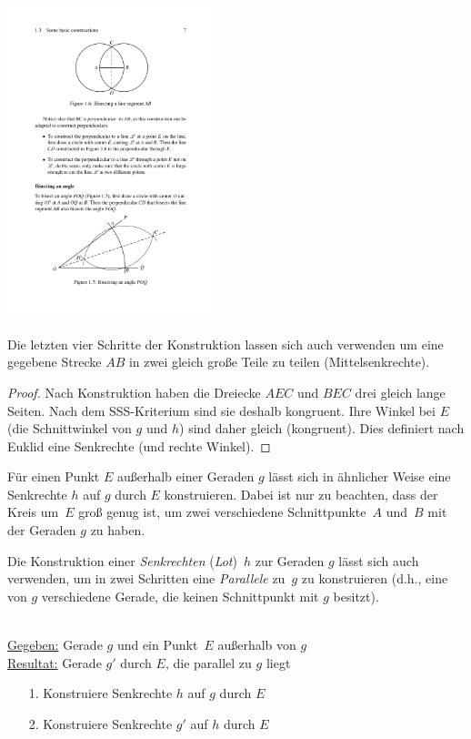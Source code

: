 \centerline{\includegraphics[width=6cm]{BILDER/BildKonstruktionStreckenhalbierung.pdf}}


Die letzten vier Schritte der Konstruktion lassen sich auch
verwenden um eine gegebene Strecke $AB$ in zwei gleich große Teile zu
teilen (Mittelsenkrechte).




\begin{proof}
Nach Konstruktion haben die Dreiecke $AEC$ und $BEC$ drei gleich lange
Seiten. Nach dem SSS-Kriterium sind sie deshalb kongruent. Ihre Winkel
bei $E$ (die Schnittwinkel von $g$ und $h$) sind daher gleich
(kongruent). 
Dies definiert nach Euklid eine Senkrechte (und rechte Winkel).
\end{proof}

Für einen Punkt $E$ außerhalb einer Geraden $g$ lässt sich 
in ähnlicher Weise eine Senkrechte $h$ auf $g$ durch $E$ konstruieren.
Dabei ist nur zu beachten, dass der Kreis um~$E$ groß genug ist, um
zwei verschiedene Schnittpunkte~$A$ und~$B$ mit der Geraden $g$ zu
haben.

Die Konstruktion einer  {\em Senkrechten} ({\em Lot})~$h$ zur Geraden $g$
lässt sich auch verwenden, um in zwei Schritten eine {\em Parallele}
zu~$g$ zu konstruieren (d.h., eine von $g$ verschiedene Gerade, die
keinen Schnittpunkt mit $g$ besitzt).



\begin{konst}  
\phantom{Pups}\hspace*{1cm}\phantom{Pups}\\
\underline{Gegeben:} Gerade $g$ und ein Punkt~$E$ außerhalb von $g$\\ 
\underline{Resultat:} Gerade $g'$ durch $E$, die parallel zu $g$ liegt 
\begin{enumerate}
\item[1.] Konstruiere Senkrechte $h$ auf $g$ durch $E$ 
\item[2.] Konstruiere Senkrechte $g'$ auf $h$ durch $E$ 
\end{enumerate}
\end{konst}



